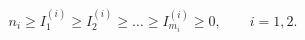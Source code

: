 \begin{equation}
n_{i}\ge I^{(i)}_{1}\ge I^{(i)}_{2}\ge\dots\ge I^{(i)}_{m_{i}}\ge 
0,\qquad i=1,2.
\label{iranges}
\end{equation}

